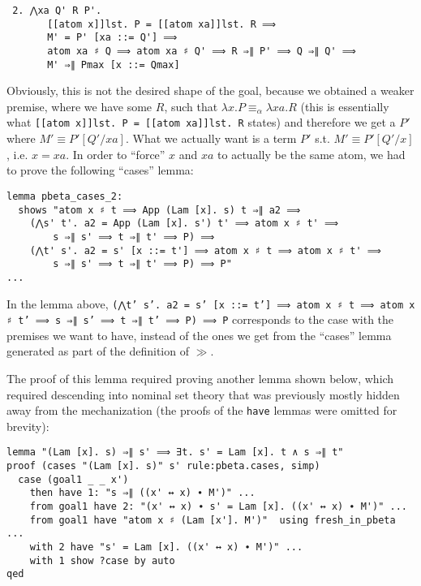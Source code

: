 \documentclass[a4paper, 12pt, twoside]{style/ociamthesis}
\theoremstyle{plain}
\theoremstyle{definition}
\theoremstyle{remark}
\begin{document}
\begin{verbatim}
 2. ⋀xa Q' R P'.
       [[atom x]]lst. P = [[atom xa]]lst. R ⟹
       M' = P' [xa ::= Q'] ⟹
       atom xa ♯ Q ⟹ atom xa ♯ Q' ⟹ R ⇒∥ P' ⟹ Q ⇒∥ Q' ⟹ 
       M' ⇒∥ Pmax [x ::= Qmax]
\end{verbatim}

Obviously, this is not the desired shape of the goal, because we
obtained a weaker premise, where we have some \(R\), such that
\(\lambda x. P \equiv_\alpha \lambda xa. R\) (this is essentially what
\texttt{[[atom x]]lst. P = [[atom xa]]lst. R} states) and therefore we
get a \(P'\) where \(M' \equiv P'[Q'/xa]\). What we actually want is a
term \(P'\) s.t. \(M' \equiv P'[Q'/x]\), i.e. \(x = xa\). In order to
``force'' \(x\) and \(xa\) to actually be the same atom, we had to prove
the following ``cases'' lemma:

\begin{verbatim}
lemma pbeta_cases_2:
  shows "atom x ♯ t ⟹ App (Lam [x]. s) t ⇒∥ a2 ⟹ 
    (⋀s' t'. a2 = App (Lam [x]. s') t' ⟹ atom x ♯ t' ⟹ 
        s ⇒∥ s' ⟹ t ⇒∥ t' ⟹ P) ⟹
    (⋀t' s'. a2 = s' [x ::= t'] ⟹ atom x ♯ t ⟹ atom x ♯ t' ⟹ 
        s ⇒∥ s' ⟹ t ⇒∥ t' ⟹ P) ⟹ P"
...
\end{verbatim}

In the lemma above,
\texttt{(⋀t' s'. a2 = s' [x ::= t'] ⟹ atom x ♯ t ⟹ atom x ♯ t' ⟹ s ⇒∥ s' ⟹ t ⇒∥ t' ⟹ P) ⟹ P}
corresponds to the case with the premises we want to have, instead of
the ones we get from the ``cases'' lemma generated as part of the
definition of \(\gg\).

The proof of this lemma required proving another lemma shown below,
which required descending into nominal set theory that was previously
mostly hidden away from the mechanization (the proofs of the
\texttt{have} lemmas were omitted for brevity):

\begin{verbatim}
lemma "(Lam [x]. s) ⇒∥ s' ⟹ ∃t. s' = Lam [x]. t ∧ s ⇒∥ t"
proof (cases "(Lam [x]. s)" s' rule:pbeta.cases, simp)
  case (goal1 _ _ x')
    then have 1: "s ⇒∥ ((x' ↔ x) ∙ M')" ...
    from goal1 have 2: "(x' ↔ x) ∙ s' = Lam [x]. ((x' ↔ x) ∙ M')" ...
    from goal1 have "atom x ♯ (Lam [x']. M')"  using fresh_in_pbeta ...
    with 2 have "s' = Lam [x]. ((x' ↔ x) ∙ M')" ...
    with 1 show ?case by auto
qed
\end{verbatim}
\end{document}
